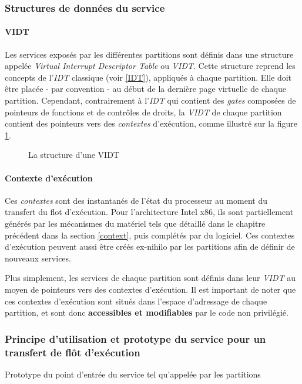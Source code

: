 	\subsubsection{Structures de données du service}

	\paragraph{VIDT} Les services exposés par les différentes partitions sont définis dans une structure appelée \emph{Virtual Interrupt Descriptor Table} ou \emph{VIDT}. Cette structure reprend les concepts de l'\emph{IDT} classique (voir \ref{IDT}), appliqués à chaque partition. Elle doit être placée - par convention - au début de la dernière page virtuelle de chaque partition. Cependant, contrairement à l'\emph{IDT} qui contient des \emph{gates} composées de pointeurs de fonctions et de contrôles de droits, la \emph{VIDT} de chaque partition contient des pointeurs vers des \emph{contextes} d'exécution, comme illustré sur la figure \ref{fig:vidt}.

\begin{figure}[!ht]
	\centering
	
	\caption{La structure d'une VIDT}
	\label{fig:vidt}
\end{figure}

	\paragraph{Contexte d'exécution} Ces \emph{contextes} sont des instantanés de l'état du processeur au moment du transfert du flot d'exécution. Pour l'architecture Intel x86, ils sont partiellement générés par les mécanismes du matériel tels que détaillé dans le chapitre précédent dans la section \ref{context}, puis complétés par du logiciel. Ces contextes d'exécution peuvent aussi être créés ex-nihilo par les partitions afin de définir de nouveaux services.


Plus simplement, les services de chaque partition sont définis dans leur \emph{VIDT} au moyen de pointeurs vers des contextes d'exécution. Il est important de noter que ces contextes d'exécution sont situés dans l'espace d'adressage de chaque partition, et sont donc \textbf{accessibles et modifiables} par le code non privilégié.

	\subsubsection{Principe d'utilisation et prototype du service pour un transfert de flôt d'exécution}
	\label{sec:service_usage}
	\begin{listing}[!ht]
		\caption{Prototype du point d'entrée du service tel qu'appelée par les partitions}
		\label{code:c_proto}
	\end{listing}

